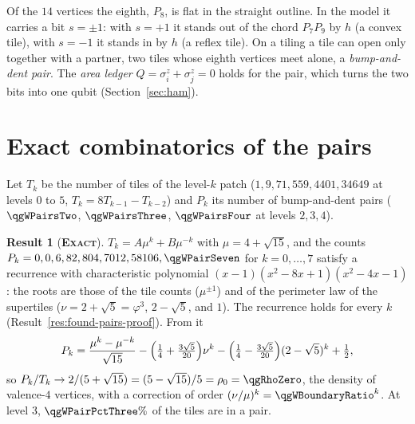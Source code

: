 \documentclass[11pt]{article}
\newcommand{\exact}{\textbf{\textsc{Exact}}}
\theoremstyle{definition}
\newtheorem{result}{Result}
\begin{document}
Of the $14$ vertices the eighth, $P_8$, is flat in the straight outline. In the model it carries a bit $s=\pm1$: with $s=+1$ it stands out of the chord $P_7P_9$ by $h$ (a convex tile), with $s=-1$ it stands in by $h$ (a reflex tile). On a tiling a tile can open only together with a partner, two tiles whose eighth vertices meet alone, a \emph{bump-and-dent pair}. The \emph{area ledger} $Q=\sigma^z_i+\sigma^z_j=0$ holds for the pair, which turns the two bits into one qubit (Section~\ref{sec:ham}).

\section{Exact combinatorics of the pairs}\label{sec:pairs}
Let $T_k$ be the number of tiles of the level-$k$ patch ($1,9,71,559,4401,34649$ at levels $0$ to $5$, $T_k=8T_{k-1}-T_{k-2}$) and $P_k$ its number of bump-and-dent pairs ($\qgWPairsTwo$, $\qgWPairsThree$, $\qgWPairsFour$ at levels $2,3,4$).
\begin{result}[\exact]\label{res:found-pairs}
$T_k=A\mu^k+B\mu^{-k}$ with $\mu=4+\sqrt{15}$, and the counts $P_k=0,0,6,82,804,7012,58106,\qgWPairSeven$ for $k=0,\dots,7$ satisfy a recurrence with characteristic polynomial $(x-1)(x^2-8x+1)(x^2-4x-1)$: the roots are those of the tile counts ($\mu^{\pm1}$) and of the perimeter law of the supertiles ($\nu=2+\sqrt5=\varphi^3$, $2-\sqrt5$, and $1$). The recurrence holds for every $k$ (Result~\ref{res:found-pairs-proof}). From it
\[
P_k=\frac{\mu^k-\mu^{-k}}{\sqrt{15}}-\Bigl(\tfrac14+\tfrac{3\sqrt5}{20}\Bigr)\nu^k-\Bigl(\tfrac14-\tfrac{3\sqrt5}{20}\Bigr)(2-\sqrt5)^k+\tfrac12,
\]
so $P_k/T_k\to2/(5+\sqrt{15})=(5-\sqrt{15})/5=\rho_0=\qgRhoZero$, the density of valence-$4$ vertices, with a correction of order $(\nu/\mu)^k=\qgWBoundaryRatio^k$. At level $3$, $\qgWPairPctThree\%$ of the tiles are in a pair.
\end{result}
\end{document}
